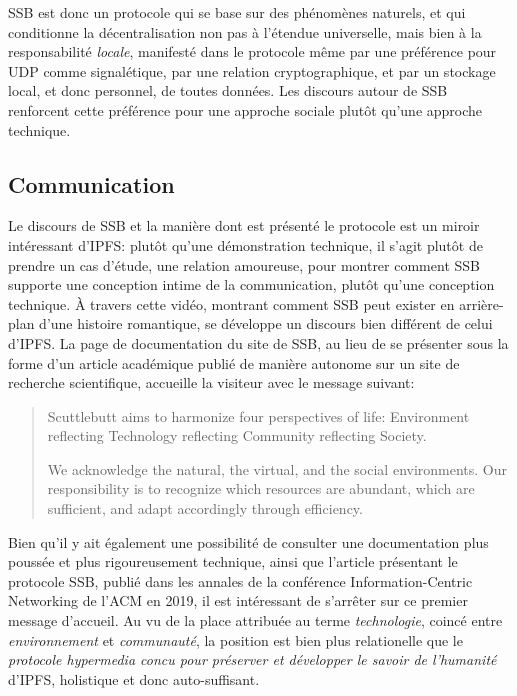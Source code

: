 \documentclass{article}
\begin{document}
SSB est donc un protocole qui se base sur des phénomènes naturels, et qui conditionne la décentralisation non pas à l'étendue universelle, mais bien à la responsabilité \emph{locale}, manifesté dans le protocole même par une préférence pour UDP comme signalétique, par une relation cryptographique, et par un stockage local, et donc personnel, de toutes données. Les discours autour de SSB renforcent cette préférence pour une approche sociale plutôt qu'une approche technique.

\subsection{Communication}

Le discours de SSB et la manière dont est présenté le protocole est un miroir intéressant d'IPFS: plutôt qu'une démonstration technique, il s'agit plutôt de prendre un cas d'étude, une relation amoureuse, pour montrer comment SSB supporte une conception intime de la communication, plutôt qu'une conception technique\cite{mandeville_scuttlebutt_nodate}. À travers cette vidéo, montrant comment SSB peut exister en arrière-plan d'une histoire romantique, se développe un discours bien différent de celui d'IPFS. La page de documentation du site de SSB, au lieu de se présenter sous la forme d'un article académique publié de manière autonome sur un site de recherche scientifique, accueille la visiteur avec le message suivant:

\begin{quote}
    Scuttlebutt aims to harmonize four perspectives of life: Environment reflecting Technology reflecting Community reflecting Society.

    We acknowledge the natural, the virtual, and the social environments. Our responsibility is to recognize which resources are abundant, which are sufficient, and adapt accordingly through efficiency.
\end{quote}

Bien qu'il y ait également une possibilité de consulter une documentation plus poussée et plus rigoureusement technique, ainsi que l'article présentant le protocole SSB, publié dans les annales de la conférence Information-Centric Networking de l'ACM en 2019\cite{tarr_secure_2019}, il est intéressant de s'arrêter sur ce premier message d'accueil. Au vu de la place attribuée au terme \emph{technologie}, coincé entre \emph{environnement} et \emph{communauté}, la position est bien plus relationelle que le \emph{protocole hypermedia concu pour préserver et développer le savoir de l'humanité} d'IPFS, holistique et donc auto-suffisant.
\end{document}
